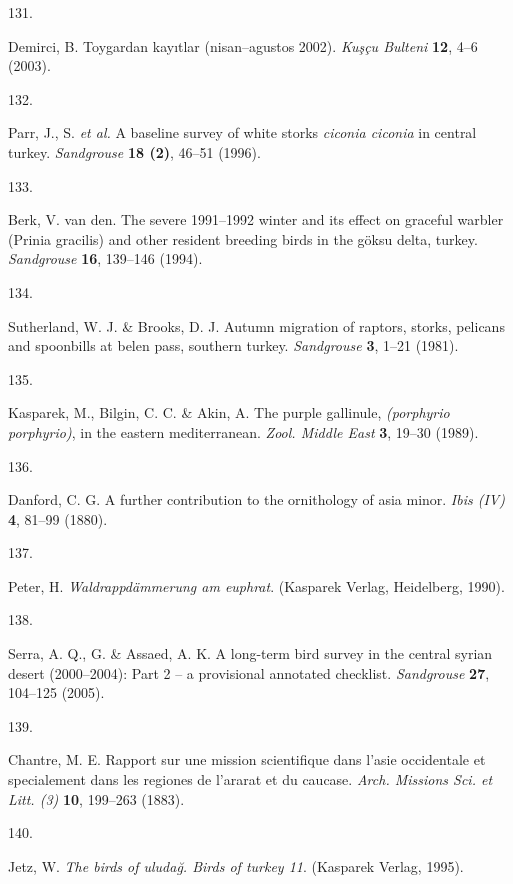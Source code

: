 \documentclass[
  letterpaper,
  DIV=11,
  numbers=noendperiod]{scrreprt}
\newlength{\cslhangindent}
\newlength{\csllabelwidth}
\newenvironment{CSLReferences}[2] %
 {\begin{list}{}{%
  \setlength{\itemindent}{0pt}
  \setlength{\leftmargin}{0pt}
  \setlength{\parsep}{0pt}
  \ifodd #1
   \setlength{\leftmargin}{\cslhangindent}
   \setlength{\itemindent}{-1\cslhangindent}
  \fi
  \setlength{\itemsep}{#2\baselineskip}}}
 {\end{list}}
\newcommand{\CSLLeftMargin}[1]{\parbox[t]{\csllabelwidth}{\strut#1\strut}}
\newcommand{\CSLRightInline}[1]{\parbox[t]{\linewidth - \csllabelwidth}{\strut#1\strut}}
\begin{document}
\begin{CSLReferences}{0}{0}
\CSLLeftMargin{131. }%
\CSLRightInline{Demirci, B. Toygardan kayıtlar (nisan--agustos 2002).
\emph{Kuşçu Bulteni} \textbf{12}, 4--6 (2003).}

\CSLLeftMargin{132. }%
\CSLRightInline{Parr, J., S. \emph{et al.} A baseline survey of white
storks \emph{ciconia ciconia} in central turkey. \emph{Sandgrouse}
\textbf{18 (2)}, 46--51 (1996).}

\CSLLeftMargin{133. }%
\CSLRightInline{Berk, V. van den. The severe 1991--1992 winter and its
effect on graceful warbler ({Prinia gracilis}) and other resident
breeding birds in the göksu delta, turkey. \emph{Sandgrouse}
\textbf{16}, 139--146 (1994).}

\CSLLeftMargin{134. }%
\CSLRightInline{Sutherland, W. J. \& Brooks, D. J. Autumn migration of
raptors, storks, pelicans and spoonbills at belen pass, southern turkey.
\emph{Sandgrouse} \textbf{3}, 1--21 (1981).}

\CSLLeftMargin{135. }%
\CSLRightInline{Kasparek, M., Bilgin, C. C. \& Akin, A. The purple
gallinule, \emph{(porphyrio porphyrio)}, in the eastern mediterranean.
\emph{Zool. Middle East} \textbf{3}, 19--30 (1989).}

\CSLLeftMargin{136. }%
\CSLRightInline{Danford, C. G. A further contribution to the ornithology
of asia minor. \emph{Ibis (IV)} \textbf{4}, 81--99 (1880).}

\CSLLeftMargin{137. }%
\CSLRightInline{Peter, H. \emph{Waldrappdämmerung am euphrat}. (Kasparek
Verlag, Heidelberg, 1990).}

\CSLLeftMargin{138. }%
\CSLRightInline{Serra, A. Q., G. \& Assaed, A. K. A long-term bird
survey in the central syrian desert (2000--2004): Part 2 -- a
provisional annotated checklist. \emph{Sandgrouse} \textbf{27}, 104--125
(2005).}

\CSLLeftMargin{139. }%
\CSLRightInline{Chantre, M. E. Rapport sur une mission scientifique dans
l'asie occidentale et specialement dans les regiones de l'ararat et du
caucase. \emph{Arch. Missions Sci. et Litt. (3)} \textbf{10}, 199--263
(1883).}

\CSLLeftMargin{140. }%
\CSLRightInline{Jetz, W. \emph{The birds of uludağ. Birds of turkey 11}.
(Kasparek Verlag, 1995).}


\end{CSLReferences}
\end{document}

